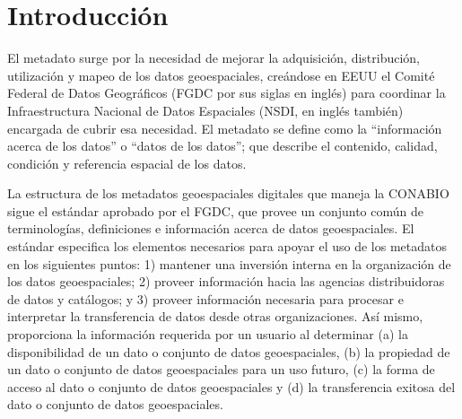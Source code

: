 \documentclass[twoside]{book}
\begin{document}
\tableofcontents
\setcounter{tocdepth}{3} %
\mainmatter %




\chapter*{Introducción}


El metadato surge por la necesidad de mejorar la adquisición, distribución, utilización y mapeo de los datos geoespaciales, creándose en EEUU el Comité Federal de Datos Geográficos (FGDC por sus siglas en inglés) para coordinar la Infraestructura Nacional de Datos Espaciales (NSDI, en inglés también) encargada de cubrir esa necesidad. El metadato se define como la “información acerca de los datos” o “datos de los datos”; que describe el contenido, calidad, condición y referencia espacial de los datos. 

La estructura de los metadatos geoespaciales digitales que maneja la CONABIO sigue el estándar aprobado por el FGDC, que provee un conjunto común de terminologías, definiciones e información acerca de datos geoespaciales. El estándar especifica los elementos necesarios para apoyar el uso de los metadatos en los siguientes puntos: 1) mantener una inversión interna en la organización de los datos geoespaciales; 2) proveer información hacia las agencias distribuidoras de datos y catálogos; y 3) proveer información necesaria para procesar e interpretar la transferencia de datos desde otras organizaciones. Así mismo, proporciona la información requerida por un usuario al determinar (a) la disponibilidad de un dato o conjunto de datos geoespaciales, (b) la propiedad de un dato o conjunto de datos geoespaciales para un uso futuro, (c) la forma de acceso al dato o conjunto de datos geoespaciales y (d) la transferencia exitosa del dato o conjunto de datos geoespaciales.
\end{document}

